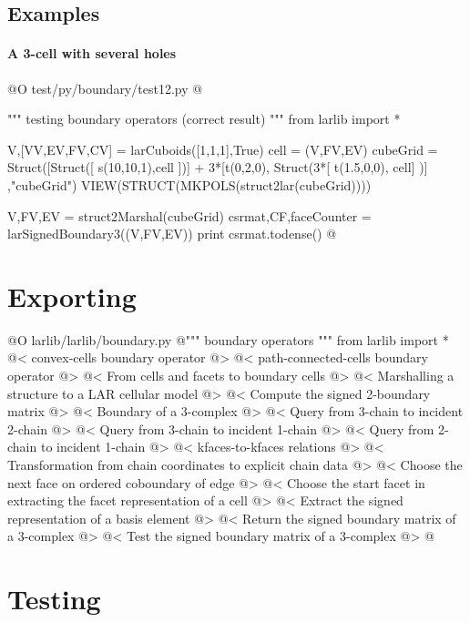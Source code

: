 \documentclass[11pt,oneside]{article}    %
\begin{document}
\subsection{Examples}

\paragraph{A 3-cell with several holes}
@O test/py/boundary/test12.py
@{""" testing boundary operators (correct result) """
from larlib import *

V,[VV,EV,FV,CV] = larCuboids([1,1,1],True)
cell = (V,FV,EV)
cubeGrid =  Struct([Struct([ s(10,10,1),cell ])] + 3*[t(0,2,0), Struct(3*[ t(1.5,0,0), cell] )] ,"cubeGrid")
VIEW(STRUCT(MKPOLS(struct2lar(cubeGrid))))

V,FV,EV = struct2Marshal(cubeGrid)
csrmat,CF,faceCounter = larSignedBoundary3((V,FV,EV))
print csrmat.todense()
@}



\section{Exporting}


@O larlib/larlib/boundary.py
@{""" boundary operators """
from larlib import *
@< convex-cells boundary operator @>
@< path-connected-cells boundary operator @>
@< From cells and facets to boundary cells @>
@< Marshalling a structure to a LAR cellular model @>
@< Compute the signed 2-boundary matrix @>
@< Boundary of a 3-complex @>
@< Query from 3-chain to incident 2-chain @>
@< Query from 3-chain to incident 1-chain @>
@< Query from 2-chain to incident 1-chain @>
@< kfaces-to-kfaces relations @>
@< Transformation from chain coordinates to explicit chain data @>
@< Choose the next face on ordered coboundary of edge @>
@< Choose the start facet in extracting the facet representation of a cell @>
@< Extract the signed representation of a basis element @>
@< Return the signed boundary matrix of a 3-complex @>
@< Test the signed boundary matrix of a 3-complex @>
@}


\section{Testing}
\end{document}
